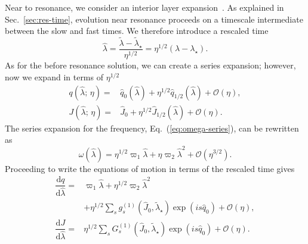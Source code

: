 \documentclass[aps,prd,amsfonts,amssymb,amsmath,nofootinbib,showpacs,superscriptaddress,twocolumn,floatfix]{revtex4-1}
\newcommand{\eqnref}[1]{Eq.~(\ref{eq:#1})}
\newcommand{\secref}[1]{Sec.~\ref{sec:#1}}
\newcommand{\dd}{\ensuremath{\mathrm{d}}}
\newcommand{\diff}[2]{\ensuremath{\dfrac{\dd {#1}}{\dd {#2}}}}
\newcommand{\order}[1]{\ensuremath{\mathcal{O}({#1})}}
\begin{document}
Near to resonance, we consider an interior layer expansion~\cite{Kevorkian1971}. As explained in \secref{res-time}, evolution near resonance proceeds on a timescale intermediate between the slow and fast times. We therefore introduce a rescaled time
\begin{equation}
\widehat{\lambda} = \dfrac{\widetilde{\lambda} - \widetilde{\lambda}_\star}{\eta^{1/2}} = \eta^{1/2}(\lambda - \lambda_\star).
\end{equation}
As for the before resonance solution, we can create a series expansion; however, now we expand in terms of $\eta^{1/2}$~\cite{Flanagan2012}
\begin{subequations}
\begin{align}
q\left(\widehat{\lambda};\,\eta\right) = {} & \widehat{q}_0\left(\widehat{\lambda}\right) + \eta^{1/2} \widehat{q}_{1/2}\left(\widehat{\lambda}\right) + \order{\eta}, \\
J\left(\widehat{\lambda};\,\eta\right) = {} & \widehat{J}_0 + \eta^{1/2} \widehat{J}_{1/2}\left(\widehat{\lambda}\right) + \order{\eta}.
\end{align}
\end{subequations}
The series expansion for the frequency, \eqnref{omega-series}, can be rewritten as
\begin{equation}
\omega\left(\widehat{\lambda}\right) = \eta^{1/2}\varpi_1\widehat{\lambda} + \eta\varpi_2\widehat{\lambda}^2 + \order{\eta^{3/2}}.
\label{eq:omega-hat}
\end{equation}
Proceeding to write the equations of motion in terms of the rescaled time gives
\begin{subequations}
\begin{align}
\diff{q}{\widehat{\lambda}} = {} & \varpi_1\widehat{\lambda} + \eta^{1/2}\varpi_2\widehat{\lambda}^2 \nonumber \\ 
 {} & + \left. \eta^{1/2}\sum_s g_s^{(1)}\left(\widehat{J}_0,\widetilde{\lambda}_\star\right)\exp(is \widehat{q}_0)  + \order{\eta}, \right. \\
\diff{J}{\widehat{\lambda}} = {} & \eta^{1/2}\sum_s G_s^{(1)}\left(\widehat{J}_0,\widetilde{\lambda}_\star\right)\exp(is \widehat{q}_0) + \order{\eta}.
\end{align}
\end{subequations}
\end{document}
